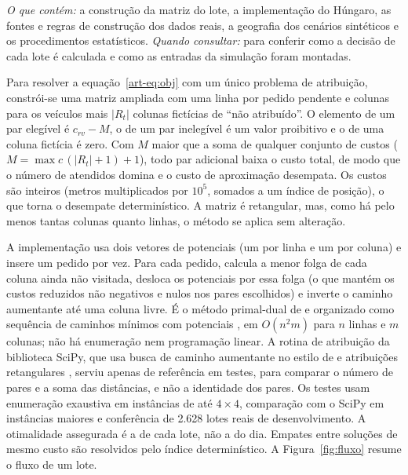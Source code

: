 
\textit{O que contém:} a construção da matriz do lote, a implementação do Húngaro, as fontes e regras de construção dos dados reais, a geografia dos cenários sintéticos e os procedimentos estatísticos. \textit{Quando consultar:} para conferir como a decisão de cada lote é calculada e como as entradas da simulação foram montadas.


Para resolver a equação~\ref{art-eq:obj} com um único problema de atribuição, constrói-se uma matriz ampliada com uma linha por pedido pendente e colunas para os veículos mais $|R_t|$ colunas fictícias de \enquote{não atribuído}. O elemento de um par elegível é $c_{rv}-M$, o de um par inelegível é um valor proibitivo e o de uma coluna fictícia é zero. Com $M$ maior que a soma de qualquer conjunto de custos ($M=\max c\,(|R_t|+1)+1$), todo par adicional baixa o custo total, de modo que o número de atendidos domina e o custo de aproximação desempata. Os custos são inteiros (metros multiplicados por $10^5$, somados a um índice de posição), o que torna o desempate determinístico. A matriz é retangular, mas, como há pelo menos tantas colunas quanto linhas, o método se aplica sem alteração.


A implementação usa dois vetores de potenciais (um por linha e um por coluna) e insere um pedido por vez. Para cada pedido, calcula a menor folga de cada coluna ainda não visitada, desloca os potenciais por essa folga (o que mantém os custos reduzidos não negativos e nulos nos pares escolhidos) e inverte o caminho aumentante até uma coluna livre. É o método primal-dual de  e  organizado como sequência de caminhos mínimos com potenciais \cite{tomizawa1971, edmondskarp1972}, em $O(n^2 m)$ para $n$ linhas e $m$ colunas; não há enumeração nem programação linear. A rotina de atribuição da biblioteca SciPy, que usa busca de caminho aumentante no estilo de  e atribuições retangulares \cite{crouse2016}, serviu apenas de referência em testes, para comparar o número de pares e a soma das distâncias, e não a identidade dos pares. Os testes usam enumeração exaustiva em instâncias de até $4\times4$, comparação com o SciPy em instâncias maiores e conferência de 2.628 lotes reais de desenvolvimento. A otimalidade assegurada é a de cada lote, não a do dia. Empates entre soluções de mesmo custo são resolvidos pelo índice determinístico. A Figura~\ref{fig:fluxo} resume o fluxo de um lote.

